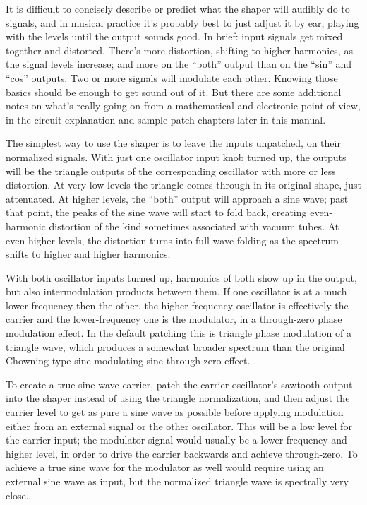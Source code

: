 It is difficult to concisely describe or predict what the shaper will
audibly do to signals, and in musical practice it's probably best to just
adjust it by ear, playing with the levels until the output sounds good.  In
brief: input signals get mixed together and distorted.  There's more
distortion, shifting to higher harmonics, as the signal levels increase; and
more on the ``both'' output than on the ``sin'' and ``cos'' outputs.  Two or
more signals will modulate each other.  Knowing those basics should be
enough to get sound out of it.  But there are some additional notes on
what's really going on from a mathematical and electronic point of view, in
the circuit explanation and sample patch chapters later in this manual.

The simplest way to use the shaper is to leave the inputs unpatched, on
their normalized signals.  With just one oscillator input knob turned up,
the outputs will be the triangle outputs of the corresponding oscillator
with more or less distortion.  At very low levels the triangle comes through
in its original shape, just attenuated.  At higher levels, the ``both''
output will approach a sine wave; past that point, the peaks of the
sine wave will start to fold back, creating even-harmonic distortion of the
kind sometimes associated with vacuum tubes.  At even higher levels, the
distortion turns into full wave-folding as the spectrum shifts to higher and
higher harmonics.

With both oscillator inputs turned up, harmonics of both show up in the
output, but also intermodulation products between them.  If one oscillator
is at a much lower frequency then the other, the higher-frequency oscillator
is effectively the carrier and the lower-frequency one is the modulator, in
a through-zero phase modulation effect.  In the default patching this is
triangle phase modulation of a triangle wave, which produces a somewhat
broader spectrum than the original Chowning-type sine-modulating-sine
through-zero effect.

To create a true sine-wave carrier, patch the carrier oscillator's sawtooth
output into the shaper instead of using the triangle normalization, and then
adjust the carrier level to get as pure a sine wave as possible before
applying modulation either from an external signal or the other oscillator. 
This will be a low level for the carrier input; the modulator signal would
usually be a lower frequency and higher level, in order to drive the carrier
backwards and achieve through-zero.  To achieve a true sine wave for the
modulator as well would require using an external sine wave as input, but
the normalized triangle wave is spectrally very close.

